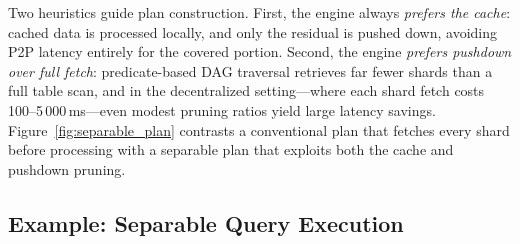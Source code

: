 Two heuristics guide plan construction.  First, the engine always
\emph{prefers the cache}: cached data is processed locally, and only the residual is pushed down, avoiding P2P latency entirely for the covered portion.  Second, the engine \emph{prefers pushdown over full fetch}: predicate-based DAG traversal retrieves far fewer shards than a full table scan, and in the decentralized setting---where each shard fetch costs 100--5\,000\,ms---even modest pruning ratios yield large latency savings.  Figure~\ref{fig:separable_plan} contrasts a
conventional plan that fetches every shard before processing with a separable plan that exploits both the cache and pushdown pruning.


\subsection{Example: Separable Query Execution}
\label{sec:example_join}

